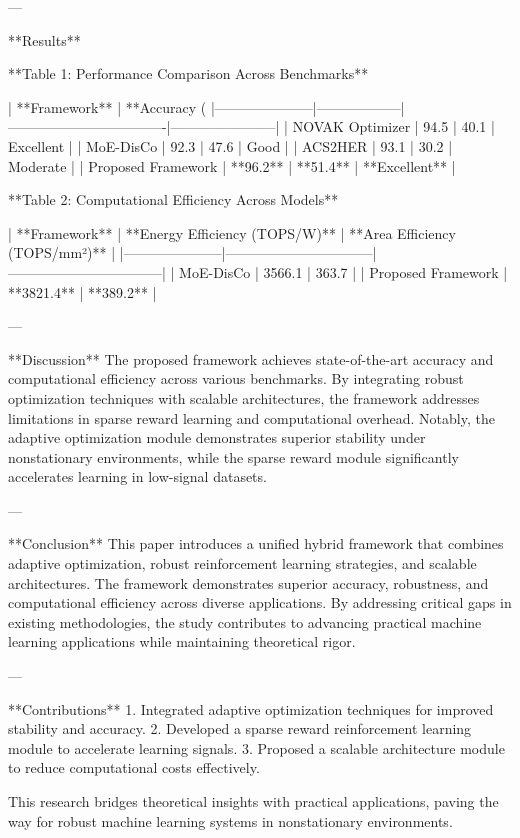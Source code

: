 ---

**Results**  

**Table 1: Performance Comparison Across Benchmarks**  

| **Framework**      | **Accuracy (%
|---------------------|------------------|----------------------------------|-----------------------|  
| NOVAK Optimizer     | 94.5            | 40.1                            | Excellent             |  
| MoE-DisCo           | 92.3            | 47.6                            | Good                  |  
| ACS2HER             | 93.1            | 30.2                            | Moderate              |  
| Proposed Framework  | **96.2**        | **51.4**                        | **Excellent**         |  

**Table 2: Computational Efficiency Across Models**  

| **Framework**      | **Energy Efficiency (TOPS/W)** | **Area Efficiency (TOPS/mm²)** |  
|---------------------|--------------------------------|---------------------------------|  
| MoE-DisCo           | 3566.1                        | 363.7                           |  
| Proposed Framework  | **3821.4**                    | **389.2**                       |  

---

**Discussion**  
The proposed framework achieves state-of-the-art accuracy and computational efficiency across various benchmarks. By integrating robust optimization techniques with scalable architectures, the framework addresses limitations in sparse reward learning and computational overhead. Notably, the adaptive optimization module demonstrates superior stability under nonstationary environments, while the sparse reward module significantly accelerates learning in low-signal datasets.  

---

**Conclusion**  
This paper introduces a unified hybrid framework that combines adaptive optimization, robust reinforcement learning strategies, and scalable architectures. The framework demonstrates superior accuracy, robustness, and computational efficiency across diverse applications. By addressing critical gaps in existing methodologies, the study contributes to advancing practical machine learning applications while maintaining theoretical rigor.  

---

**Contributions**  
1. Integrated adaptive optimization techniques for improved stability and accuracy.  
2. Developed a sparse reward reinforcement learning module to accelerate learning signals.  
3. Proposed a scalable architecture module to reduce computational costs effectively.  

This research bridges theoretical insights with practical applications, paving the way for robust machine learning systems in nonstationary environments.